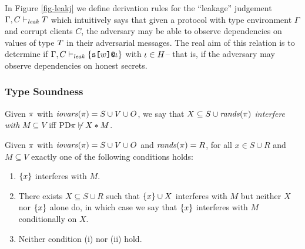 In Figure \ref{fig-leakj} we define derivation rules for the
``leakage'' judgement $\Gamma,C \vdash_{\mathit{leak}} T$ which intuitively says
that given a protocol with type environment $\Gamma$ and corrupt
clients $C$, the adversary may be able to observe dependencies on
values of type $T$ in their adversarial messages.  The real aim of
this relation is to determine if
$\Gamma,C \vdash_{\mathit{leak}} \{ \texttt{s[}w\texttt{]}\texttt{@}\iota \}$ with $\iota \in H$-- that is,
if the adversary may observe dependencies on honest secrets.

\subsubsection{Type Soundness}

\begin{definition}
  Given $\pi$ with $\mathit{iovars}(\pi) = S \cup V \cup O$, we say that
  $X \subseteq S \cup \mathit{rands}(\pi)$ \emph{interfere with} 
  $M \subseteq V$ iff $\mathrm{PD}{\pi} \not\vdash X * M$.
\end{definition}

\begin{lemma}
  \label{lemma-interference}
  Given $\pi$ with $\mathit{iovars}(\pi) = S \cup V \cup O$ and $\mathit{rands}(\pi) = R$,
  for all $x \in S \cup R$ and $M \subseteq V$ exactly one of the following conditions holds:
  \begin{enumerate}[\hspace{5mm}i.]
  \item $\{ x \}$ interferes with $M$.
  \item There exists $X \subseteq S \cup R$ such that $\{ x \} \cup X$ interferes
    with $M$ but neither $X$ nor $\{ x \}$ alone do, in which case we say
    that $\{ x \}$ interferes with $M$ conditionally on $X$.
  \item Neither condition (i) nor (ii) hold.
  \end{enumerate}
\end{lemma}


